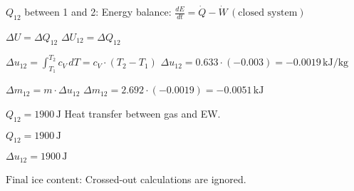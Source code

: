 \( Q_{12} \) between 1 and 2:  
Energy balance:  
\( \frac{dE}{dt} = \dot{Q} - \dot{W} \, (\text{closed system}) \)  

\( \Delta U = \Delta Q_{12} \)  
\( \Delta U_{12} = \Delta Q_{12} \)  

\( \Delta u_{12} = \int_{T_1}^{T_2} c_V \, dT = c_V \cdot (T_2 - T_1) \)  
\( \Delta u_{12} = 0.633 \cdot (-0.003) = -0.0019 \, \text{kJ/kg} \)  

\( \Delta m_{12} = m \cdot \Delta u_{12} \)  
\( \Delta m_{12} = 2.692 \cdot (-0.0019) = -0.0051 \, \text{kJ} \)  

\( Q_{12} = 1900 \, \text{J} \)  
Heat transfer between gas and EW.  

\( Q_{12} = 1900 \, \text{J} \)  

\( \Delta u_{12} = 1900 \, \text{J} \)  

\( \text{Final ice content:} \)  
Crossed-out calculations are ignored.
